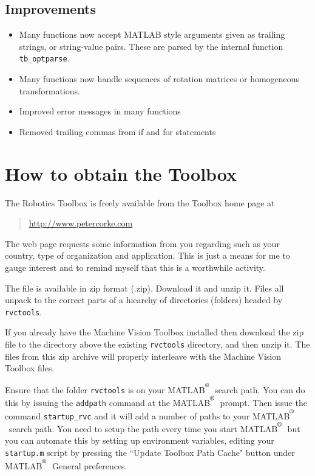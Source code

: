 \documentclass[a4paper]{report}
\def\Mlab{MATLAB$^{\textsuperscript{\textregistered}}$}
\begin{document}
\subsection{Improvements}
\begin{itemize}
\item Many functions now accept MATLAB style arguments given as trailing strings, or string-value pairs.  These are parsed by the internal
function \texttt{tb\_optparse}.
\item Many functions now handle sequences of rotation matrices or homogeneous transformations.
\item Improved error messages in many functions
\item Removed trailing commas from if and for statements
\end{itemize}

\section{How to obtain the Toolbox}
The Robotics Toolbox is freely available from the Toolbox home
page at 
\begin{quote}
\url{http://www.petercorke.com}
\end{quote}

The web page requests some information from you
regarding such as your country, type of organization and application.
This is just a means for me to gauge interest and to remind myself
that this is a worthwhile activity.

The file is available in zip format (.zip).  Download it and unzip it.
Files all unpack to the correct parts of a hiearchy of directories (folders)
headed by \texttt{rvctools}.

If you already have the Machine Vision Toolbox installed then download
the zip file to the directory above the existing \texttt{rvctools} directory,
and then unzip it.
The files from this zip archive will properly interleave with the Machine
Vision Toolbox files.

Ensure that the folder \texttt{rvctools} is on your \Mlab\ search
path.  You can do this by issuing the \texttt{addpath} command at 
the \Mlab\ prompt.
Then issue the command \texttt{startup\_rvc} and it will add a number
of paths to your \Mlab\ search path.
You need to setup the path every time you start \Mlab\ but you can 
automate this by setting up environment variables, editing your 
\texttt{startup.m} script by pressing the ``Update Toolbox Path
Cache" button under \Mlab\ General preferences.
\end{document}
